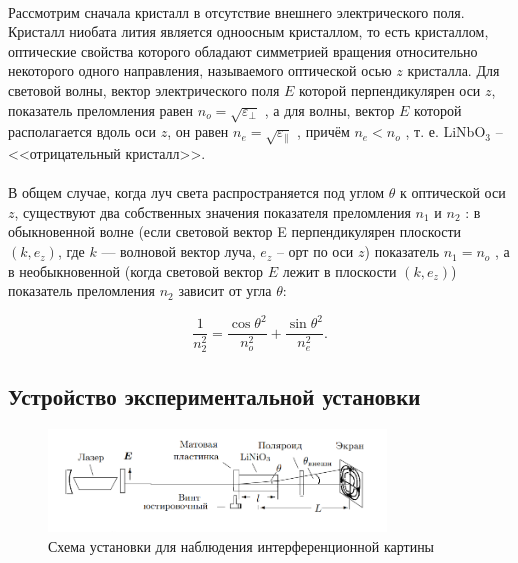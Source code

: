 \documentclass[a4paper,12pt]{article} %
\begin{document}
\paragraph{} Рассмотрим сначала кристалл в отсутствие внешнего электрического поля. Кристалл ниобата лития является одноосным кристаллом, то есть кристаллом, оптические свойства которого обладают симметрией вращения относительно некоторого одного направления, называемого оптической осью $z$ кристалла. Для световой волны, вектор электрического поля $E$ которой перпендикулярен оси $z$, показатель преломления равен $n_o = \sqrt{\varepsilon_\perp}$ , а для волны, вектор $E$ которой располагается вдоль оси $z$, он равен $n_e = \sqrt{\varepsilon_\parallel}$ , причём $n_e < n_o$ , т. е. LiNbO$_3$ -- <<отрицательный кристалл>>.

\paragraph{} В общем случае, когда луч света распространяется под углом $\theta$ к оптической оси $z$, существуют два собственных значения показателя преломления $n_1$ и $n_2$ : в обыкновенной волне (если световой вектор E перпендикулярен плоскости $(k, e_z )$, где $k$ — волновой вектор луча, $e_z$ -- орт по оси $z$) показатель $n_1 = n_o$ , а в необыкновенной (когда световой вектор $E$ лежит в плоскости $(k, e_z )$) показатель преломления $n_2$ зависит от угла $\theta$:

\begin{equation}
\frac{1}{n_2^2} = \frac{\cos{\theta}^2}{n_o^2} + \frac{\sin{\theta}^2}{n_e^2}.
\end{equation}

\subsection{Устройство экспериментальной установки}

\begin{figure}[h]
\centering
\includegraphics[width=0.8\textwidth]{setup.png}
\caption{Схема установки для наблюдения интерференционной картины}
\label{fig:setup}
\end{figure}
\end{document}
